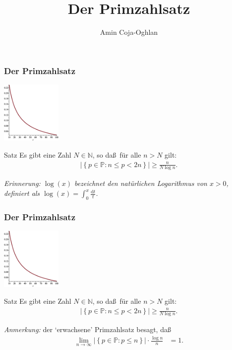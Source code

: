 \documentclass{beamer}
\title[Linadi]{Der Primzahlsatz}
\author[Amin Coja-Oghlan]{Amin Coja-Oghlan}
\institute[Frankfurt]{JWGUFFM}
\date{}
\renewcommand{\emph}[1]{{\textcolor{solarizedRed}{\itshape #1}}}
\newcommand\NN{\mathbb N}
\newcommand\PP{\mathbb P}
\newcommand{\abs}[1]{\left|#1\right|}
\newcommand\cbc[1]{\left\{{#1}\right\}}
\newcommand{\ue}{\"u}
\begin{document}
\frame[plain]{\titlepage}

\begin{frame}\frametitle{Der Primzahlsatz}
	\hfill\includegraphics[height=30mm]{pics/pnt.eps}
	\begin{block}{Satz}
		Es gibt eine Zahl $N\in\NN$, so da\ss\ f\ue r alle $n>N$ gilt:
		\begin{align*}
		\abs{\cbc{p\in\PP:n\leq p<2n}}\geq\frac{n}{N\log n}.
		\end{align*}
	\end{block}

	\bigskip
	{\itshape Erinnerung: $\log(x)$ bezeichnet den nat\ue rlichen Logarithmus von $x>0$, definiert als $\log(x)=\int_0^x\frac{\mathrm dt}{t}$.}
\end{frame}

\begin{frame}\frametitle{Der Primzahlsatz}
	\hfill\includegraphics[height=30mm]{pics/pnt.eps}
	\begin{block}{Satz}
		Es gibt eine Zahl $N\in\NN$, so da\ss\ f\ue r alle $n>N$ gilt:
		\begin{align*}
		\abs{\cbc{p\in\PP:n\leq p<2n}}\geq\frac{n}{N\log n}.
		\end{align*}
	\end{block}

	\bigskip
	\emph{Anmerkung:} der `erwachsene' Primzahlsatz besagt, da\ss\
	\begin{align*}
		\lim_{n\to\infty}\abs{\cbc{p\in\PP:p\leq n}}\cdot\frac{\log n}{n}&=1.
	\end{align*}
\end{frame}
\end{document}
